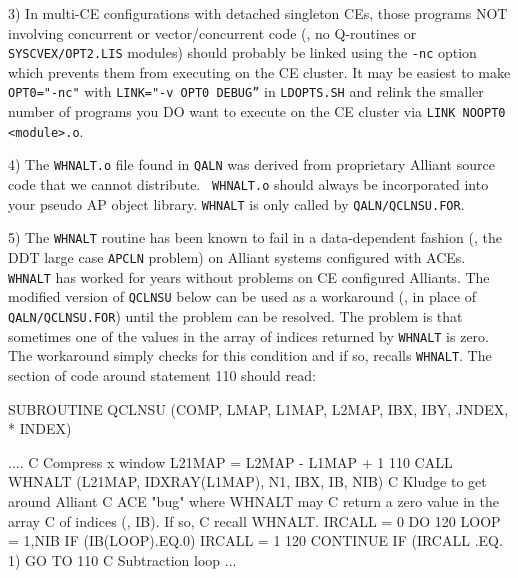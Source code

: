 {\item{3)} In multi-CE configurations with detached singleton CEs, those
programs NOT involving concurrent or vector/concurrent code (\eg, no
Q-routines or {\tt\dol SYSCVEX/OPT2.LIS} modules) should probably be
linked using the {\tt -nc} option which prevents them from executing
on the CE cluster.  It may be easiest to make {\tt OPT0="-nc"} with
{\tt LINK="-v \dol OPT0 \dol DEBUG''} in {\tt LDOPTS.SH} and relink the
smaller number of programs you DO want to execute on the CE cluster
via {\tt LINK NOOPT0 <module>.o}.

\item{4)} The {\tt WHNALT.o} file found in {\tt\dol QALN} was derived
from proprietary Alliant source code that we cannot distribute.  {\tt
WHNALT.o} should always be incorporated into your pseudo AP object
library.  {\tt WHNALT} is only called by {\tt\dol QALN/QCLNSU.FOR}.

\item{5)} The {\tt WHNALT} routine has been known to fail in a
data-dependent fashion (\eg, the DDT large case {\tt APCLN} problem)
on Alliant systems configured with ACEs.  {\tt WHNALT} has worked for
years without problems on CE configured Alliants.  The modified
version of {\tt QCLNSU} below can be used as a workaround (\ie, in
place of {\tt\dol QALN/QCLNSU.FOR}) until the problem can be resolved.
The problem is that sometimes one of the values in the array of
indices returned by {\tt WHNALT} is zero.  The workaround simply
checks for this condition and if so, recalls {\tt WHNALT}.  The section of
code around statement 110 should read:\medskip
\fortran

      SUBROUTINE QCLNSU (COMP, LMAP, L1MAP, L2MAP, IBX, IBY, JNDEX,
     *   INDEX)

      ....
C                                        Compress x window
      L21MAP = L2MAP - L1MAP + 1
 110  CALL WHNALT (L21MAP, IDXRAY(L1MAP), N1, IBX, IB, NIB)
C                                       Kludge to get around Alliant
C                                       ACE "bug" where WHNALT may
C                                       return a zero value in the array
C                                       of indices (\ie, IB).  If so,
C                                       recall WHNALT.
      IRCALL = 0
      DO 120 LOOP = 1,NIB
         IF (IB(LOOP).EQ.0) IRCALL = 1
 120     CONTINUE
      IF (IRCALL .EQ. 1) GO TO 110
C                                        Subtraction loop
      ...
\endfortran
\medskip\noindent

}
